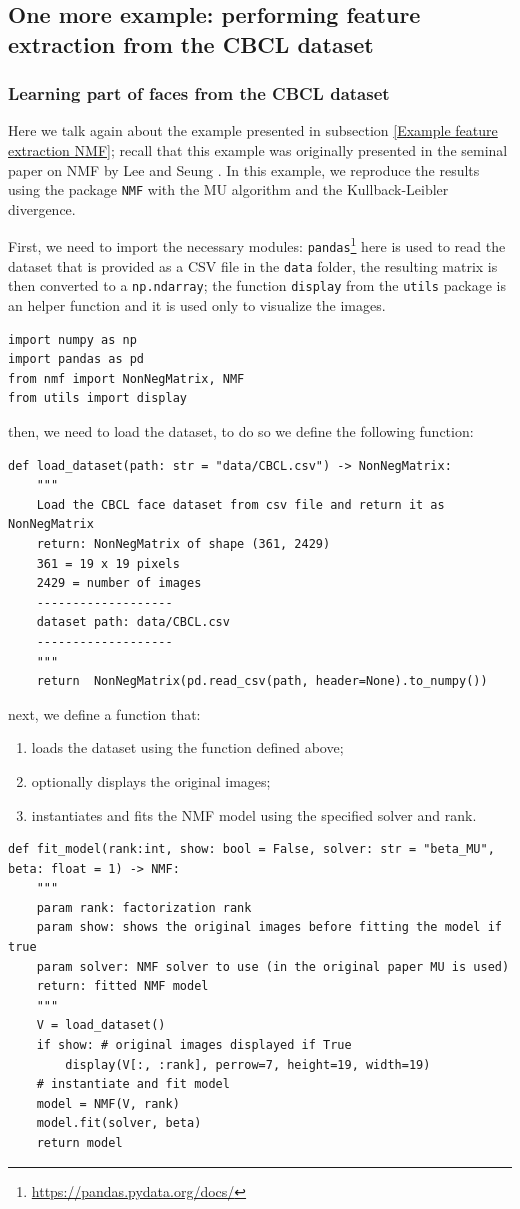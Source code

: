 \subsection{One more example: performing feature extraction from the CBCL dataset} 
\subsubsection{Learning part of faces from the CBCL dataset}
Here we talk again about the example presented in subsection \ref{Example feature extraction NMF}; recall that this example was originally presented in the seminal paper on NMF by Lee and Seung \cite{Lee1999}. 
In this example, we reproduce the results using the package \texttt{NMF} with the MU algorithm and the Kullback-Leibler divergence.
\par
First, we need to import the necessary modules: \texttt{pandas}\footnote{\url{https://pandas.pydata.org/docs/}} here is used to read the dataset that is provided as a CSV file in the \texttt{data} folder, the resulting matrix is then converted to a \texttt{np.ndarray};
the function \texttt{display} from the \texttt{utils} package is an helper function and it is used only to visualize the images.
\begin{lstlisting}
import numpy as np
import pandas as pd
from nmf import NonNegMatrix, NMF
from utils import display
\end{lstlisting}
then, we need to load the dataset, to do so we define the following function:
\begin{lstlisting}
def load_dataset(path: str = "data/CBCL.csv") -> NonNegMatrix:
    """
    Load the CBCL face dataset from csv file and return it as NonNegMatrix
    return: NonNegMatrix of shape (361, 2429)
    361 = 19 x 19 pixels
    2429 = number of images
    -------------------
    dataset path: data/CBCL.csv
    -------------------
    """
    return  NonNegMatrix(pd.read_csv(path, header=None).to_numpy())  
\end{lstlisting}
next, we define a function that: 
\begin{enumerate}
    \item loads the dataset using the function defined above;
    \item optionally displays the original images;
    \item instantiates and fits the NMF model using the specified solver and rank.
\end{enumerate}
\begin{lstlisting}
def fit_model(rank:int, show: bool = False, solver: str = "beta_MU", beta: float = 1) -> NMF:
    """
    param rank: factorization rank
    param show: shows the original images before fitting the model if true
    param solver: NMF solver to use (in the original paper MU is used)
    return: fitted NMF model
    """ 
    V = load_dataset()    
    if show: # original images displayed if True
        display(V[:, :rank], perrow=7, height=19, width=19)
    # instantiate and fit model
    model = NMF(V, rank)
    model.fit(solver, beta)
    return model    
\end{lstlisting}
